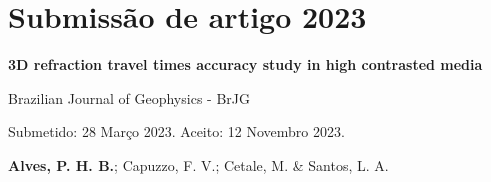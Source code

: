 \chapter{Submissão de artigo 2023}
\begin{center}
	\textbf{3D refraction travel times accuracy study in high contrasted media}
\end{center}

\begin{center}
	Brazilian Journal of Geophysics - BrJG 
\end{center}

\begin{center}
	Submetido: 28 Março 2023. 
	Aceito: 12 Novembro 2023.
\end{center}

\begin{center}
	\textbf{Alves, P. H. B.}; Capuzzo, F. V.; Cetale, M. \& Santos, L. A.    
\end{center}



